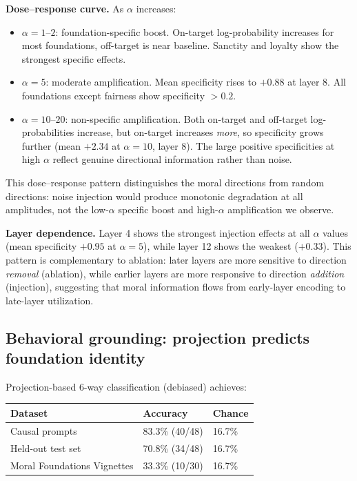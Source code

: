 \textbf{Dose--response curve.} As \(\alpha\) increases:

\begin{itemize}
\tightlist
\item
  \(\alpha = 1\)--\(2\): foundation-specific boost. On-target log-probability increases for most foundations, off-target is near baseline. Sanctity and loyalty show the strongest specific effects.
\item
  \(\alpha = 5\): moderate amplification. Mean specificity rises to \(+0.88\) at layer 8. All foundations except fairness show specificity \(> 0.2\).
\item
  \(\alpha = 10\)--\(20\): non-specific amplification. Both on-target and off-target log-probabilities increase, but on-target increases \emph{more}, so specificity grows further (mean \(+2.34\) at \(\alpha = 10\), layer 8). The large positive specificities at high \(\alpha\) reflect genuine directional information rather than noise.
\end{itemize}

This dose--response pattern distinguishes the moral directions from random directions: noise injection would produce monotonic degradation at all amplitudes, not the low-\(\alpha\) specific boost and high-\(\alpha\) amplification we observe.

\textbf{Layer dependence.} Layer 4 shows the strongest injection effects at all \(\alpha\) values (mean specificity \(+0.95\) at \(\alpha = 5\)), while layer 12 shows the weakest (\(+0.33\)).
This pattern is complementary to ablation: later layers are more sensitive to direction \emph{removal} (ablation), while earlier layers are more responsive to direction \emph{addition} (injection), suggesting that moral information flows from early-layer encoding to late-layer utilization.

\subsection{\texorpdfstring{Behavioral grounding: projection predicts foundation identity \label{behavioral-grounding}}{Behavioral grounding: projection predicts foundation identity }}\label{behavioral-grounding-projection-predicts-foundation-identity}

Projection-based 6-way classification (debiased) achieves:

\begin{table}[h]
\centering
\small
\begin{tabular}{lll}
\toprule
Dataset & Accuracy & Chance \\
\midrule
Causal prompts & 83.3\% (40/48) & 16.7\% \\
Held-out test set & 70.8\% (34/48) & 16.7\% \\
Moral Foundations Vignettes & 33.3\% (10/30) & 16.7\% \\
\bottomrule
\end{tabular}
\end{table}

